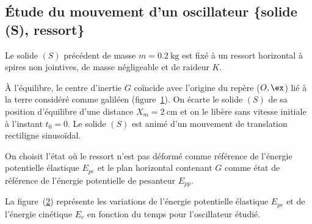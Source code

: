 \subsection{Étude du mouvement d'un oscillateur \{solide (S), ressort\}}
\begin{minipage}{0.64\linewidth}
Le solide $(S)$ précédent de masse $m=\qty{0,2}{\kg}$ est fixé à un ressort
horizontal à spires non jointives, de masse négligeable et de raideur $K$.

À l'équilibre, le centre d'inertie $G$ coïncide avec l'origine du repère
($O,\ex$) lié à la terre considéré comme galiléen
(figure~\ref{fig:solide_ressort}). On écarte le solide $(S)$ de sa position
d'équilibre d'une distance $X_{m}=\qty{2}{\cm}$ et on le libère sans vitesse
initiale à l'instant $t_{0}=0$. Le solide $(S)$ est animé d'un mouvement de
translation rectiligne sinusoïdal.

On choisit l'état où le ressort n'est pas déformé comme référence de l'énergie
potentielle élastique $E_{pe}$ et le plan horizontal contenant $G$ comme état de
référence de l'énergie potentielle de pesanteur $E_{pp}$.

La figure~(\ref{fig:Ec_et_Epe_de_t}) représente les variations de l'énergie
potentielle élastique $E_{pe}$ et de l'énergie cinétique $E_{c}$ en fonction du
temps pour l'oscillateur étudié.
\end{minipage}
\hfill
\begin{minipage}{0.35\linewidth}
\begin{figure}[H]
    \centering
    
    \caption{}
    \label{fig:solide_ressort}
\end{figure}
\begin{figure}[H]
    \centering
    \caption{}
    \label{fig:Ec_et_Epe_de_t}
\end{figure}
\end{minipage}

